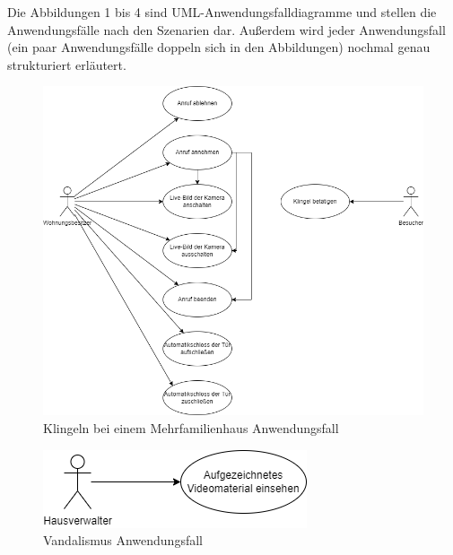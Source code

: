 Die Abbildungen 1 bis 4 sind UML-Anwendungsfalldiagramme und stellen die Anwendungsfälle nach den Szenarien dar.
Außerdem wird jeder Anwendungsfall (ein paar Anwendungsfälle doppeln sich in den Abbildungen) nochmal genau strukturiert erläutert.

\begin{figure}[ht!]
    \includegraphics[width=\paperwidth-2in]{../assets/img/UML-Anwendungsfalldiagramme-Klingeln bei einem Mehrfamilienhaus}
    \caption{Klingeln bei einem Mehrfamilienhaus Anwendungsfall}
    \label{fig:klingeln-bei-einem-mehrfamilienhaus}
\end{figure}

\begin{figure}[ht!]
    \includegraphics[width=\paperwidth-2in]{../assets/img/UML-Anwendungsfalldiagramme-Vandalismus.drawio}
    \caption{Vandalismus Anwendungsfall}
    \label{fig:vandalismus}
\end{figure}

